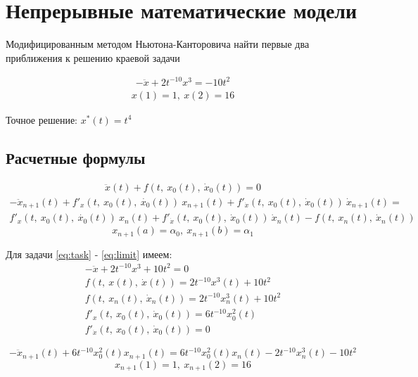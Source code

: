 \documentclass[12pt]{article}
\begin{document}
\section*{Непрерывные математические модели}

Модифицированным методом Ньютона-Канторовича найти первые два приближения к решению краевой задачи

\begin{gather}
    -\ddot{x} + 2t^{-10}x^3 = -10t^2 \label{eq:task}
\end{gather}
\begin{gather}
    x(1)=1,\ x(2)=16 \label{eq:limit}
\end{gather}

Точное решение: $x^*(t) = t^4$

\subsection*{Расчетные формулы}



\begin{gather}
\ddot{x}(t) + f(t,\ x_0(t),\ \dot{x}_0(t)) = 0
\end{gather}
\begin{multline}
	-\ddot{x}_{n+1}(t) + f'_x(t,\ x_0(t),\ \dot{x_0}(t))\ x_{n+1}(t) +
	f'_{\dot{x}}(t,\ x_0(t),\ \dot{x}_0(t))\ \dot{x}_{n+1}(t) = \\
	f'_x(t,\ x_0(t),\ \dot{x_0}(t))\ x_n(t) +
	f'_{\dot{x}}(t,\ x_0(t),\ \dot{x}_0(t))\ \dot{x}_n(t) -
	f(t,\ x_n(t),\ \dot{x}_n(t))
\end{multline}
\begin{equation}
	x_{n+1}(a) = \alpha_0,\ x_{n+1}(b) = \alpha_1
\end{equation}

Для задачи \eqref{eq:task} - \eqref{eq:limit} имеем:
\begin{gather*}
	-\ddot{x} + 2t^{-10}x^3 + 10t^2 = 0 \\
	f(t,\ x(t),\ \dot{x}(t)) = 2t^{-10}x^3(t) + 10t^2 \\
	f(t,\ x_n(t),\ \dot{x}_n(t)) = 2t^{-10}x^3_n(t) + 10t^2 \\
	f'_x(t,\ x_0(t),\ \dot{x}_0(t)) = 6t^{-10}x^2_0(t) \\
	f'_{\dot{x}}(t,\ x_0(t),\ \dot{x}_0(t)) = 0
\end{gather*}

\begin{equation}
    -\ddot{x}_{n+1}(t) + 6t^{-10}x^2_0(t)x_{n+1}(t) =
     6t^{-10}x^2_0(t)x_n(t) - 2t^{-10}x^3_n(t) - 10t^2
\end{equation}
\begin{equation}
    x_{n+1}(1)=1,\ x_{n+1}(2)=16
\end{equation}
\end{document}
